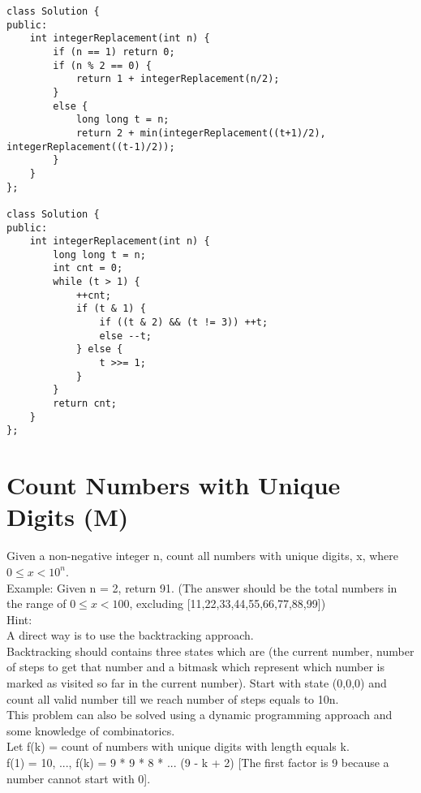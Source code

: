 \begin{lstlisting}
class Solution {
public:
    int integerReplacement(int n) {
        if (n == 1) return 0;
        if (n % 2 == 0) {
            return 1 + integerReplacement(n/2);
        }
        else {
            long long t = n;
            return 2 + min(integerReplacement((t+1)/2), integerReplacement((t-1)/2));
        }
    }
};

class Solution {
public:
    int integerReplacement(int n) {
        long long t = n;
        int cnt = 0;
        while (t > 1) {
            ++cnt;
            if (t & 1) {
                if ((t & 2) && (t != 3)) ++t;
                else --t;
            } else {
                t >>= 1;
            }
        }
        return cnt;
    }
};
\end{lstlisting}


\section{Count Numbers with Unique Digits (M)}
Given a non-negative integer n, count all numbers with unique digits, x, where $0 \leq x < 10^n$.\\

Example:
Given n = 2, return 91. (The answer should be the total numbers in the range of $0 \leq x < 100$, excluding [11,22,33,44,55,66,77,88,99]) \\

Hint:\\
    A direct way is to use the backtracking approach.\\
    Backtracking should contains three states which are (the current number, number of steps to get that number and a bitmask which represent which number is marked as visited so far in the current number). Start with state (0,0,0) and count all valid number till we reach number of steps equals to 10n.\\
    This problem can also be solved using a dynamic programming approach and some knowledge of combinatorics.\\
    Let f(k) = count of numbers with unique digits with length equals k.\\
    f(1) = 10, ..., f(k) = 9 * 9 * 8 * ... (9 - k + 2) [The first factor is 9 because a number cannot start with 0].\\

